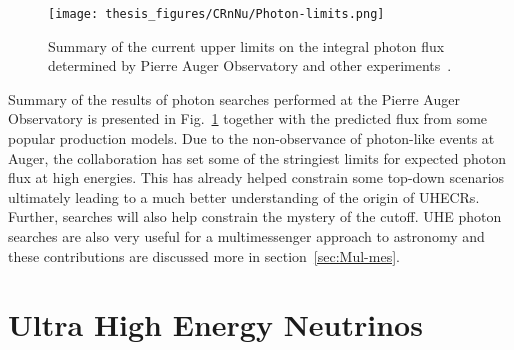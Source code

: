 \begin{figure}[t!]
  \centering
  \texttt{[image: thesis\_figures/CRnNu/Photon-limits.png]}
  \caption{Summary of the current upper limits on the integral photon flux determined by Pierre Auger Observatory and other experiments~\cite{PierreAuger:2024ayl}.}
  \label{fig:Auger-Photon-limits}
\end{figure}

Summary of the results of photon searches performed at the Pierre Auger Observatory is presented in Fig.~\ref{fig:Auger-Photon-limits} together with the predicted flux from some popular production models. Due to the non-observance of photon-like events at Auger, the collaboration has set some of the stringiest limits for expected photon flux at high energies. This has already helped constrain some top-down scenarios ultimately leading to a much better understanding of the origin of \glspl{UHECR}. Further, searches will also help constrain the mystery of the cutoff. UHE photon searches are also very useful for a multimessenger approach to astronomy and these contributions are discussed more in section~\ref{sec:Mul-mes}.


\section{Ultra High Energy Neutrinos}
\label{sec:UHENu}
